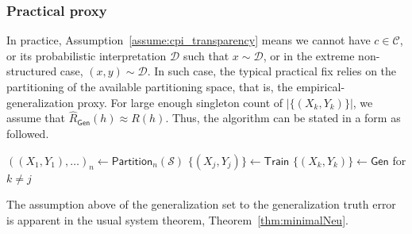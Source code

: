 \documentclass[10pt]{article} %
\begin{document}
\subsubsection{Practical proxy}

In practice, Assumption~\ref{assume:cpi_transparency} means we cannot have $c\in\mathcal{C}$, or its probabilistic interpretation $\mathcal{D}$ such that $x\sim\mathcal{D}$, or in the extreme non-structured case, $(x,y)\sim \mathcal{D}$. In such case, the typical practical fix relies on the partitioning of the available partitioning space, that is, the empirical-generalization proxy. For large enough singleton count of $|\{(X_{k},Y_{k})\}|$, we assume that $\hat{R}_{\mathsf{Gen}}(h)\approx R(h)$. Thus, the algorithm can be stated in a form as followed.

\begin{algorithm}[htb]
    \renewcommand{\algorithmcfname}{Optimization problem}
    \caption{Empirical-generalization learning dynamics (proxy)}
    \Begin
    {
        $((X_{1},Y_{1}),\dots)_{n}\gets\mathsf{Partition}_{n}(\mathcal{S})$\;
        $\{(X_{j},Y_{j})\}\gets \mathsf{Train}$\;
        $\{(X_{k},Y_{k})\}\gets \mathsf{Gen}$ for $k\ne j$\;
    }
    \label{algo:algo_optim_no_c}
\end{algorithm}

The assumption above of the generalization set to the generalization truth error is apparent in the usual system theorem, Theorem~\ref{thm:minimalNeu}.
\end{document}
